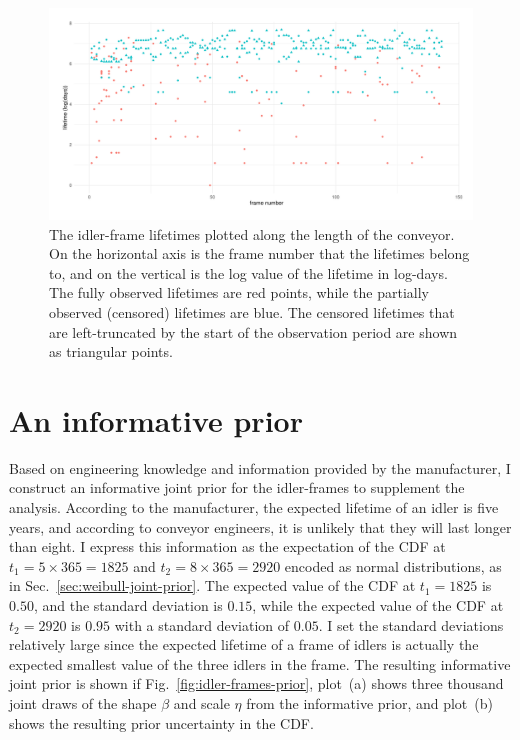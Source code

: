 \begin{figure}
  \centering
  \includegraphics[width=1\textwidth]{./figures/ch-3/idler-frame-data.pdf}
  \caption{The idler-frame lifetimes plotted along the length of the conveyor. On the horizontal axis is the frame number that the lifetimes belong to, and on the vertical is the log value of the lifetime in log-days. The fully observed lifetimes are red points, while the partially observed (censored) lifetimes are blue. The censored lifetimes that are left-truncated by the start of the observation period are shown as triangular points.}
  \label{fig:idler-frames-data}
\end{figure}

\section{An informative prior} \label{sec:idler-frame-joint-prior}

Based on engineering knowledge and information provided by the manufacturer, I construct an informative joint prior for the idler-frames to supplement the analysis. According to the manufacturer, the expected lifetime of an idler is five years, and according to conveyor engineers, it is unlikely that they will last longer than eight. I express this information as the expectation of the CDF at $t_1 = 5 \times 365 = 1825$ and $t_2 = 8 \times 365 = 2920$ encoded as normal distributions, as in Sec.~\ref{sec:weibull-joint-prior}. The expected value of the CDF at $t_1 = 1825$ is $0.50$, and the standard deviation is $0.15$, while the expected value of the CDF at $t_2 = 2920$ is $0.95$ with a standard deviation of $0.05$. I set the standard deviations relatively large since the expected lifetime of a frame of idlers is actually the expected smallest value of the three idlers in the frame. The resulting informative joint prior is shown if Fig.~\ref{fig:idler-frames-prior}, plot~(a) shows three thousand joint draws of the shape $\beta$ and scale $\eta$ from the informative prior, and plot~(b) shows the resulting prior uncertainty in the CDF.

